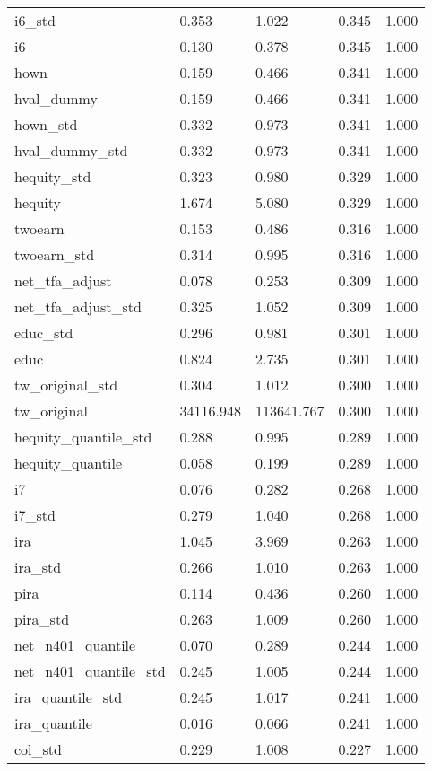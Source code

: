 \documentclass[12pt,a4paper]{article}
\begin{document}
\begin{singlespace}
\begin{ThreePartTable}
\begin{longtable}{l C{2cm} C{2cm} C{2cm} C{2cm} }
  i6\_std & 0.353 & 1.022 & 0.345 & 1.000 \\ 
  i6 & 0.130 & 0.378 & 0.345 & 1.000 \\ 
  hown & 0.159 & 0.466 & 0.341 & 1.000 \\ 
  hval\_dummy & 0.159 & 0.466 & 0.341 & 1.000 \\ 
  hown\_std & 0.332 & 0.973 & 0.341 & 1.000 \\ 
  hval\_dummy\_std & 0.332 & 0.973 & 0.341 & 1.000 \\ 
  hequity\_std & 0.323 & 0.980 & 0.329 & 1.000 \\ 
  hequity & 1.674 & 5.080 & 0.329 & 1.000 \\ 
  twoearn & 0.153 & 0.486 & 0.316 & 1.000 \\ 
  twoearn\_std & 0.314 & 0.995 & 0.316 & 1.000 \\ 
  net\_tfa\_adjust & 0.078 & 0.253 & 0.309 & 1.000 \\ 
  net\_tfa\_adjust\_std & 0.325 & 1.052 & 0.309 & 1.000 \\ 
  educ\_std & 0.296 & 0.981 & 0.301 & 1.000 \\ 
  educ & 0.824 & 2.735 & 0.301 & 1.000 \\ 
  tw\_original\_std & 0.304 & 1.012 & 0.300 & 1.000 \\ 
  tw\_original & 34116.948 & 113641.767 & 0.300 & 1.000 \\ 
  hequity\_quantile\_std & 0.288 & 0.995 & 0.289 & 1.000 \\ 
  hequity\_quantile & 0.058 & 0.199 & 0.289 & 1.000 \\ 
  i7 & 0.076 & 0.282 & 0.268 & 1.000 \\ 
  i7\_std & 0.279 & 1.040 & 0.268 & 1.000 \\ 
  ira & 1.045 & 3.969 & 0.263 & 1.000 \\ 
  ira\_std & 0.266 & 1.010 & 0.263 & 1.000 \\ 
  pira & 0.114 & 0.436 & 0.260 & 1.000 \\ 
  pira\_std & 0.263 & 1.009 & 0.260 & 1.000 \\ 
  net\_n401\_quantile & 0.070 & 0.289 & 0.244 & 1.000 \\ 
  net\_n401\_quantile\_std & 0.245 & 1.005 & 0.244 & 1.000 \\ 
  ira\_quantile\_std & 0.245 & 1.017 & 0.241 & 1.000 \\ 
  ira\_quantile & 0.016 & 0.066 & 0.241 & 1.000 \\ 
  col\_std & 0.229 & 1.008 & 0.227 & 1.000 \\ 

\end{longtable}
\end{ThreePartTable}
\end{singlespace}
\end{document}
